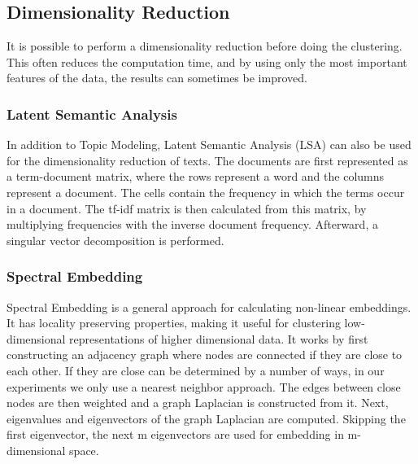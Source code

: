 \subsection{Dimensionality Reduction}
It is possible to perform a dimensionality reduction before doing the clustering.
This often reduces the computation time, and by using only the most important features of the data, the results can sometimes be improved.  

\subsubsection{Latent Semantic Analysis }
In addition to Topic Modeling, Latent Semantic Analysis (LSA) can also be used for the dimensionality reduction of texts.
The documents are first represented as a term-document matrix, where the rows represent a word and the columns represent a document.
The cells contain the frequency in which the terms occur in a document.
The tf-idf matrix is then calculated from this matrix, by multiplying frequencies with the inverse document frequency.
Afterward, a singular vector decomposition is performed.\cite{lsa}

\subsubsection{Spectral Embedding}\label{subsubsec:spectral_embedding}
Spectral Embedding is a general approach for calculating non-linear embeddings. It has locality preserving properties\cite{spectral_embedding_paper}, making it useful for clustering low-dimensional representations of higher dimensional data.
It works by first constructing an adjacency graph where nodes are connected if they are close to each other. If they are close can be determined by a number of ways, in our experiments we only use a nearest neighbor approach. The edges between close nodes are then weighted and a graph Laplacian is constructed from it. Next, eigenvalues and eigenvectors of the graph Laplacian are computed. Skipping the first eigenvector, the next m eigenvectors are used for embedding in m-dimensional space.\cite{spectral_embedding_paper}

